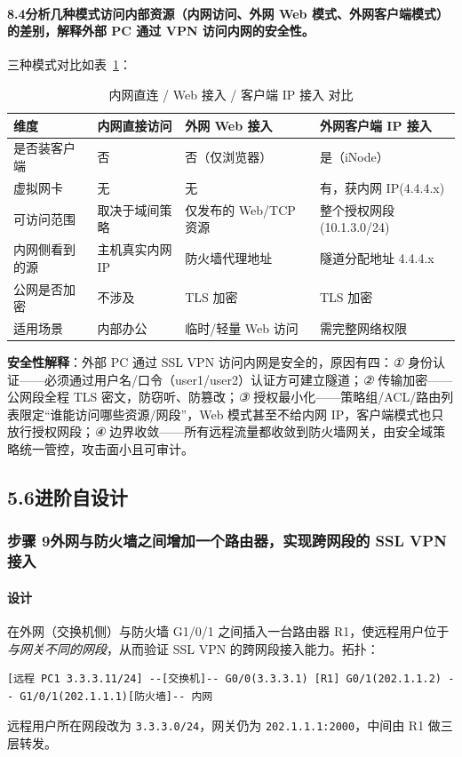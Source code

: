 \documentclass[12pt,a4paper]{article}
\begin{document}
\paragraph{8.4\quad 分析几种模式访问内部资源（内网访问、外网 Web 模式、外网客户端模式）的差别，解释外部 PC 通过 VPN 访问内网的安全性。}
三种模式对比如表~\ref{tab:cmp}：
\begin{table}[H]
\centering\caption{内网直连 / Web 接入 / 客户端 IP 接入 对比}\label{tab:cmp}
\small
\begin{tabular}{@{}p{2.4cm}p{3.5cm}p{3.5cm}p{3.5cm}@{}}
\toprule
维度 & 内网直接访问 & 外网 Web 接入 & 外网客户端 IP 接入 \\
\midrule
是否装客户端 & 否 & 否（仅浏览器） & 是（iNode） \\
虚拟网卡 & 无 & 无 & 有，获内网 IP(4.4.4.x) \\
可访问范围 & 取决于域间策略 & 仅发布的 Web/TCP 资源 & 整个授权网段(10.1.3.0/24) \\
内网侧看到的源 & 主机真实内网 IP & 防火墙代理地址 & 隧道分配地址 4.4.4.x \\
公网是否加密 & 不涉及 & TLS 加密 & TLS 加密 \\
适用场景 & 内部办公 & 临时/轻量 Web 访问 & 需完整网络权限 \\
\bottomrule
\end{tabular}
\end{table}
\textbf{安全性解释}：外部 PC 通过 SSL VPN 访问内网是安全的，原因有四：\emph{①} 身份认证——必须通过用户名/口令（user1/user2）认证方可建立隧道；\emph{②} 传输加密——公网段全程 TLS 密文，防窃听、防篡改；\emph{③} 授权最小化——策略组/ACL/路由列表限定“谁能访问哪些资源/网段”，Web 模式甚至不给内网 IP，客户端模式也只放行授权网段；\emph{④} 边界收敛——所有远程流量都收敛到防火墙网关，由安全域策略统一管控，攻击面小且可审计。

\subsection*{5.6\quad 进阶自设计}

\subsubsection*{步骤 9\quad 外网与防火墙之间增加一个路由器，实现跨网段的 SSL VPN 接入}
\paragraph{设计}在外网（交换机侧）与防火墙 G1/0/1 之间插入一台路由器 R1，使远程用户位于\emph{与网关不同的网段}，从而验证 SSL VPN 的跨网段接入能力。拓扑：
\begin{lstlisting}[basicstyle=\ttfamily\scriptsize]
[远程 PC1 3.3.3.11/24] --[交换机]-- G0/0(3.3.3.1) [R1] G0/1(202.1.1.2) -- G1/0/1(202.1.1.1)[防火墙]-- 内网
\end{lstlisting}
远程用户所在网段改为 \texttt{3.3.3.0/24}，网关仍为 \texttt{202.1.1.1:2000}，中间由 R1 做三层转发。
\end{document}
